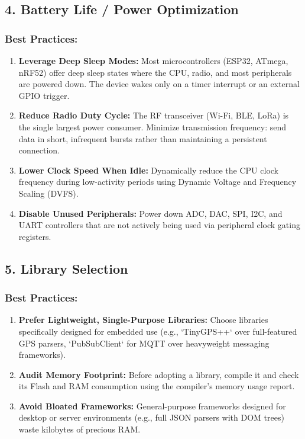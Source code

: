 \subsection{4. Battery Life / Power Optimization}

\subsubsection{Best Practices:}
\begin{enumerate}
  \item \textbf{Leverage Deep Sleep Modes:} Most microcontrollers (ESP32, ATmega, nRF52) offer deep sleep states where the CPU, radio, and most peripherals are powered down. The device wakes only on a timer interrupt or an external GPIO trigger.
  \item \textbf{Reduce Radio Duty Cycle:} The RF transceiver (Wi-Fi, BLE, LoRa) is the single largest power consumer. Minimize transmission frequency: send data in short, infrequent bursts rather than maintaining a persistent connection.
  \item \textbf{Lower Clock Speed When Idle:} Dynamically reduce the CPU clock frequency during low-activity periods using Dynamic Voltage and Frequency Scaling (DVFS).
  \item \textbf{Disable Unused Peripherals:} Power down ADC, DAC, SPI, I2C, and UART controllers that are not actively being used via peripheral clock gating registers.
\end{enumerate}


\subsection{5. Library Selection}

\subsubsection{Best Practices:}
\begin{enumerate}
  \item \textbf{Prefer Lightweight, Single-Purpose Libraries:} Choose libraries specifically designed for embedded use (e.g., `TinyGPS++` over full-featured GPS parsers, `PubSubClient` for MQTT over heavyweight messaging frameworks).
  \item \textbf{Audit Memory Footprint:} Before adopting a library, compile it and check its Flash and RAM consumption using the compiler's memory usage report.
  \item \textbf{Avoid Bloated Frameworks:} General-purpose frameworks designed for desktop or server environments (e.g., full JSON parsers with DOM trees) waste kilobytes of precious RAM.
\end{enumerate}


